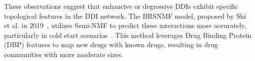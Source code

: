 \documentclass[unnumsec,webpdf,contemporary,large]{oup-authoring-template}%
\theoremstyle{thmstyleone}%
\theoremstyle{thmstyletwo}%
\theoremstyle{thmstylethree}%
\begin{document}
These observations suggest that enhancive or degressive DDIs exhibit specific topological features in the DDI network. The BRSNMF model, proposed by Shi et al. in 2019~\cite{Shi2019}, utilizes Semi-NMF to predict these interactions more accurately, particularly in cold start scenarios~\cite{lesly2018}. This method leverages Drug Binding Protein (DBP) features to map new drugs with known drugs, resulting in drug communities with more moderate sizes.

\end{document}

